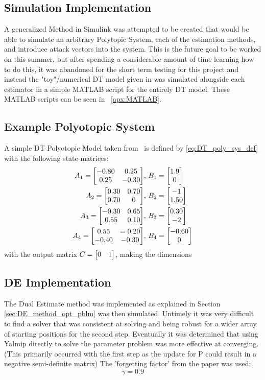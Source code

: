 \documentclass[]{ieeetran}
\begin{document}
\subsection{Simulation Implementation}
A generalized Method in Simulink was attempted to be created that would be able to simulate an arbitrary Polytopic System, each of the estimation methods, and introduce attack vectors into the system. This is the future goal to be worked on this summer, but after spending a considerable amount of time learning how to do this, it was abandoned for the short term testing for this project and instead the "toy"/numerical DT model given in \cite{beelen2017joint} was simulated alongside each estimator in a simple MATLAB script for the entirely DT model. These MATLAB scripts can be seen in \appendixname \ \ref{apx:MATLAB}.

\subsection{Example Polyotopic System}
A simple DT Polyotopic Model taken from \cite{beelen2017joint} \ is defined by \eqref{eq:DT_poly_sys_def} with the following state-matrices:
\begin{equation}
	\begin{aligned}
		A_1 = \mqty[-0.80 & 0.25\\ 0.25 & -0.30], \ &B_1 = \mqty[1.9\\0]\\
		A_2 = \mqty[0.30 & 0.70\\ 0.70 &0], \ &B_2 = \mqty[-1\\ 1.50]\\
		A_3 = \mqty[-0.30 & 0.65\\ 0.55 &0.10], \ &B_3 = \mqty[0.30\\ -2]\\
		A_4 = \mqty[0.55 & =0.20\\ -0.40 &-0.30], \ &B_4 = \mqty[-0.60\\0]
	\end{aligned}
\end{equation}
with the output matrix $C = \mqty[0 &1]$, making the dimensions 

\subsection{DE Implementation}
The Dual Estimate method was implemented as explained in Section \ref{sec:DE_method_opt_pblm} was then simulated. Untimely it was very difficult to find a solver that was consistent at solving and being robust for a wider array of starting positions for the second step. Eventually it was determined that using Yalmip directly to solve the parameter problem was more effective at converging. (This primarily occurred with the first step as the update for P could result in a negative semi-definite matrix) The 'forgetting factor' from the paper was used: $$\gamma = 0.9$$
\end{document}
